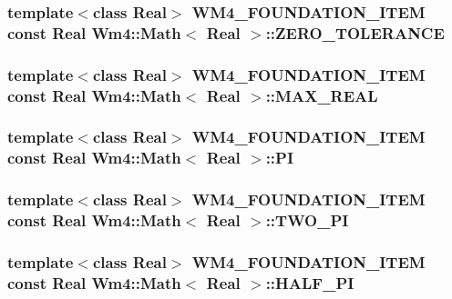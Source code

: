 \subsubsection{\setlength{\rightskip}{0pt plus 5cm}template$<$class Real$>$ WM4\_\-FOUNDATION\_\-ITEM const Real {\bf Wm4::Math}$<$ Real $>$::{\bf ZERO\_\-TOLERANCE}\hspace{0.3cm}{\tt  [static]}}\label{classWm4_1_1Math_16c4a22ba9c410abf60185cf082b2951}


\subsubsection{\setlength{\rightskip}{0pt plus 5cm}template$<$class Real$>$ WM4\_\-FOUNDATION\_\-ITEM const Real {\bf Wm4::Math}$<$ Real $>$::{\bf MAX\_\-REAL}\hspace{0.3cm}{\tt  [static]}}\label{classWm4_1_1Math_de032b84b480b45e883e1d65db857a55}


\subsubsection{\setlength{\rightskip}{0pt plus 5cm}template$<$class Real$>$ WM4\_\-FOUNDATION\_\-ITEM const Real {\bf Wm4::Math}$<$ Real $>$::{\bf PI}\hspace{0.3cm}{\tt  [static]}}\label{classWm4_1_1Math_41ed76ae25a067e71c45f3e96bee186b}


\subsubsection{\setlength{\rightskip}{0pt plus 5cm}template$<$class Real$>$ WM4\_\-FOUNDATION\_\-ITEM const Real {\bf Wm4::Math}$<$ Real $>$::{\bf TWO\_\-PI}\hspace{0.3cm}{\tt  [static]}}\label{classWm4_1_1Math_cc5062f3c348ccb4e2f16bcf75ea5ddb}


\subsubsection{\setlength{\rightskip}{0pt plus 5cm}template$<$class Real$>$ WM4\_\-FOUNDATION\_\-ITEM const Real {\bf Wm4::Math}$<$ Real $>$::{\bf HALF\_\-PI}\hspace{0.3cm}{\tt  [static]}}\label{classWm4_1_1Math_70a1d1c090a188ce377e3093a265c40b}


